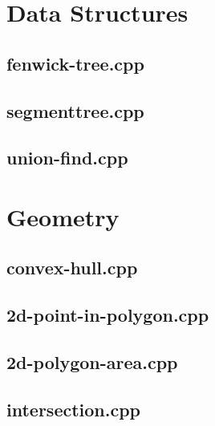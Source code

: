 \documentclass[10pt,twocolumn,landscape]{article}
\author{Make Programming Great Again!}
\begin{document}
\maketitle
\clearpage

\section{Data Structures}

\subsection{fenwick-tree.cpp}


\subsection{segmenttree.cpp}


\subsection{union-find.cpp}


\section{Geometry}

\subsection{convex-hull.cpp}


\subsection{2d-point-in-polygon.cpp}


\subsection{2d-polygon-area.cpp}


\subsection{intersection.cpp}

\end{document}
